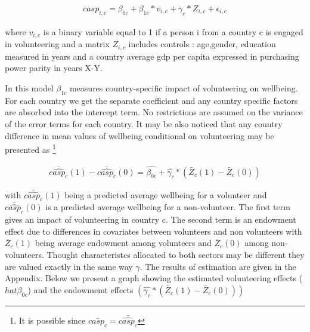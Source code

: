 \documentclass[10pt, letterpaper]{article}
\begin{document}
\begin{spacing}{1.4}
 \begin{eqnarray}
	casp_{i,c}= \beta_{0c}+ \beta_{1c}*v_{i,c} + \gamma_{c}*Z_{i,c} + \epsilon_{i,c}
 \end{eqnarray}

where $v_{i,c}$ is a binary variable equal to 1 if a person i from a country c is engaged in  volunteering  and a matrix $Z_{i,c}$ includes controls : age,gender, education measured in years and a country average gdp per capita expressed in purchasing power parity in years X-Y. 


In this model $\beta_{1c}$ measures country-specific impact of volunteering on wellbeing. For each country we get the separate coefficient and any country specific factors are absorbed into the intercept term. No restrictions are assumed on the variance of the error terms for each country. It may be also noticed that any country difference in mean values of wellbeing conditional on volunteering may be presented as \footnote{It is possible since $\bar{casp_{c}} = \bar{\hat{casp_c}}$} 

 \begin{eqnarray}
	\bar{\hat{casp_{c}}}(1)-\bar{\hat{casp_{c}}}(0)= \hat{\beta_{0c}}+\hat{\gamma_{c}}*(\bar{Z}_{c}(1)-\bar{Z}_{c}(0))
 \end{eqnarray}

with $\bar{\hat{casp_{c}}}(1)$ being a predicted average wellbeing for a volunteer and $\bar{\hat{casp_{c}}}(0)$ is a predicted average wellbeing for a non-volunteer.  The first term gives an impact of volunteering in country c. The second term is an endowment effect due to  differences in covariates between volunteers and non volunteers with $\bar{Z}_{c}(1)$ being average endowment among volunteers and $\bar{Z}_{c}(0)$ among non-volunteers. Thought characteristcs allocated to both sectors may be different they are valued exactly in the same way $\gamma$. The results of estimation are given in the Appendix. Below we present a graph showing the estimated volunteering effects ($ hat{\beta_{0c}} $) and the endowmemt effects $(\hat{\gamma_{c}}*(\bar{Z}_{c}(1)-\bar{Z}_{c}(0)))$


\end{spacing}
\end{document}
